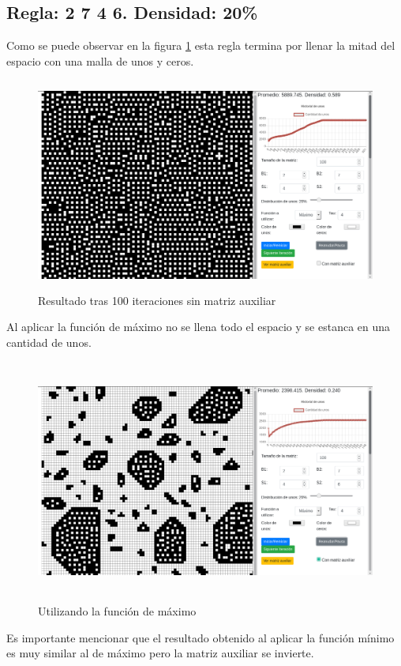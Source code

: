 \documentclass[12pt, titlepage]{article}
\begin{document}
\subsection{Regla: 2 7 4 6. Densidad: 20\%}
Como se puede observar en la figura \ref{fig:2746} esta regla termina por llenar la mitad del espacio con una malla de unos y ceros.
\begin{figure}[H]
\begin{center}
 \includegraphics[width=15cm, height=7cm]{./img/2746.png}
 \caption{Resultado tras 100 iteraciones sin matriz auxiliar}
 \label{fig:2746}
\end{center}
\end{figure}
Al aplicar la función de máximo no se llena todo el espacio y se estanca en una cantidad de unos.
\begin{figure}[H]
\begin{center}
 \includegraphics[width=15cm, height=8cm]{./img/2746-max.png}
 \caption{Utilizando la función de máximo}
 \label{fig:2746-max}
\end{center}
\end{figure}
Es importante mencionar que el resultado obtenido al aplicar la función mínimo es muy similar al de máximo pero la matriz auxiliar se invierte.
\end{document}
